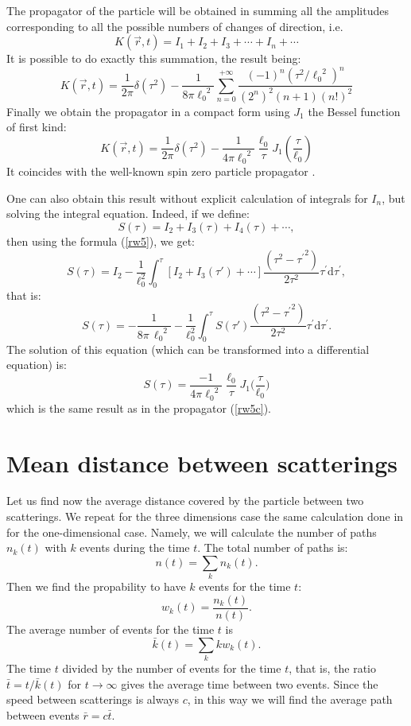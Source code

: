 \documentclass[a4paper,12pt]{article}
\newcommand{\dd}{\text{d}}%
\begin{document}
The propagator of the particle will be obtained in summing all the
amplitudes corresponding to all the possible numbers of changes of
direction, i.e.
\[
K(\vec r,t) = I_{1}+I_{2}+I_{3}+\cdots+I_{n}+\cdots
\]
It is possible to do exactly this summation, the result being:
\[
K(\vec r,t) = \frac{1}{2\pi}\delta\left(\tau^2\right)
-\dfrac{1}{8\pi{\ell_{0}}^{2}}
\sum_{n=0}^{+\infty}\dfrac{(-1)^n{\left (\tau^{2}/{\ell_{0}}^{2}\right)}^{n}}
{(2^{n})^{2}(n+1)(n!)^{2}}
\]
Finally we obtain the propagator in a compact form using $J_{1}$ the Bessel
function of first kind:
\begin{equation}\label{rw5c}
K(\vec r,t) = \frac{1}{2\pi}\delta\left(\tau^2\right)-
\frac{1}{4\pi{\ell_{0}}^{2}}
\frac{\ell_{0}}{\tau}
J_{1}\left(\frac{\tau}{\ell_{0}}\right)
\end{equation}
It coincides with the well-known spin zero particle propagator \cite{bogol}.

One can also obtain this result without explicit calculation of
integrals for $I_n$, but solving the integral equation. Indeed, if
we define:
$$
S(\tau)=I_2+I_3(\tau)+I_4(\tau)+\cdots,
$$
then using the formula (\ref{rw5}), we get:
$$
S(\tau)=I_2-\dfrac{1}{\ell_{0}^{2}} \int_{0}^{\tau}
\left[I_2+I_3(\tau')+\cdots\right]\dfrac{(\tau
^{2}-{\tau^{\prime}}^{2})}{2 \tau^{2}}\tau^{\prime}\dd
{\tau^{\prime}},
$$
that is:
\begin{equation}\label{rw5d}
S(\tau)=-\dfrac{1}{8\pi\,{\ell_{0}}^{\!\!2}}-\dfrac{1}{\ell_{0}^{2}}
\int_{0}^{\tau} S(\tau')\dfrac{(\tau ^{2}-{\tau^{\prime}}^{2})}{2
\tau^{2}}\tau^{\prime}\dd {\tau^{\prime}}.
\end{equation}
The solution of this equation (which can be transformed into a
differential equation) is: $$S(\tau)= \frac{-1}{4\pi{\ell_{0}}^{2}}
\frac{\ell_{0}}{\tau} J_{1}\bigl(\frac{\tau}{\ell_{0}}\bigr)$$
which is the same result as in the propagator (\ref{rw5c}).

\section{Mean distance between scatterings}\label{md}
Let us find now the average distance covered by the particle  between
two scatterings.
We repeat for the three dimensions case the same calculation
done in  \cite{Karmanov93} for the one-dimensional case. Namely,  we
will calculate
the number of paths $n_k(t)$ with $k$ events
during  the time $t$. The total number of paths is:
$$n(t)=\sum_k n_k(t).$$
Then we find the propability to have $k$ events for the
time $t$: $$w_k(t) = \dfrac{n_k(t)}{n(t)}.$$ The average number of
events for the time
$t$ is
\begin{equation}\label{eq0}
\bar{k}(t)=\sum_k k w_k(t).
\end{equation}
The time $t$ divided by the number of events for the time $t$, that is,
the ratio $\bar{t}=t/\bar{k}(t)$ for
$t\to\infty$ gives the  average time between two events. Since the speed
between scatterings is always  $c$, in this way we will find the  average
path between events $\bar{r}=c\bar{t}$.
\end{document}
